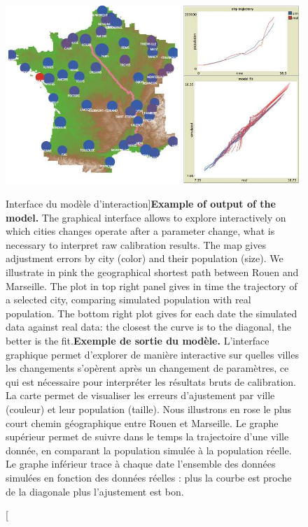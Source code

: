 \begin{figure}
\includegraphics[width=\linewidth]{Figures/Final/4-3-2-fig-interactiongibrat-interface}
\caption[Interface of the interaction model][Interface du modèle d'interaction]{\textbf{Example of output of the model.} The graphical interface allows to explore interactively on which cities changes operate after a parameter change, what is necessary to interpret raw calibration results. The map gives adjustment errors by city (color) and their population (size). We illustrate in pink the geographical shortest path between Rouen and Marseille. The plot in top right panel gives in time the trajectory of a selected city, comparing simulated population with real population. The bottom right plot gives for each date the simulated data against real data: the closest the curve is to the diagonal, the better is the fit.\label{fig:interactiongibrat:interface}}{\textbf{Exemple de sortie du modèle.} L'interface graphique permet d'explorer de manière interactive sur quelles villes les changements s'opèrent après un changement de paramètres, ce qui est nécessaire pour interpréter les résultats bruts de calibration. La carte permet de visualiser les erreurs d'ajustement par ville (couleur) et leur population (taille). Nous illustrons en rose le plus court chemin géographique entre Rouen et Marseille. Le graphe supérieur permet de suivre dans le temps la trajectoire d'une ville donnée, en comparant la population simulée à la population réelle. Le graphe inférieur trace à chaque date l'ensemble des données simulées en fonction des données réelles : plus la courbe est proche de la diagonale plus l'ajustement est bon.\label{fig:interactiongibrat:interface}}
\end{figure}



